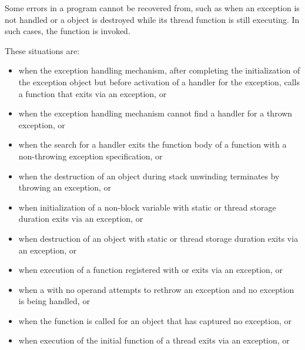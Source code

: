 \pnum
{}%
Some errors in a program cannot be recovered from, such as when an exception
is not handled or a  object is destroyed while its thread
function is still executing. In such cases,
the function  is invoked.
\begin{note}
These situations are:
%
\begin{itemize}
\item%
when the exception handling mechanism, after completing
the initialization of the exception object
but before
activation of a handler for the exception,
calls a function that exits
via an exception, or

\item%
when the exception handling mechanism cannot find a handler for a thrown exception, or

\item when the search for a handler
exits the function body of a function
with a non-throwing exception specification,
or

\item%
when the destruction of an object during stack unwinding
terminates by throwing an exception, or

\item%
when initialization of a non-block
variable with static or thread storage duration
exits via an exception, or

\item%
when destruction of an object with static or thread storage duration exits
via an exception, or

\item%
when execution of a function registered with
 or 
exits via an exception, or

\item%
when a
with no operand attempts to rethrow an exception and no exception is being
handled, or

\item%
when the function  is called for an object
that has captured no exception, or

\item%
when execution of the initial function of a thread exits via
an exception, or


\end{itemize}
\end{note}
